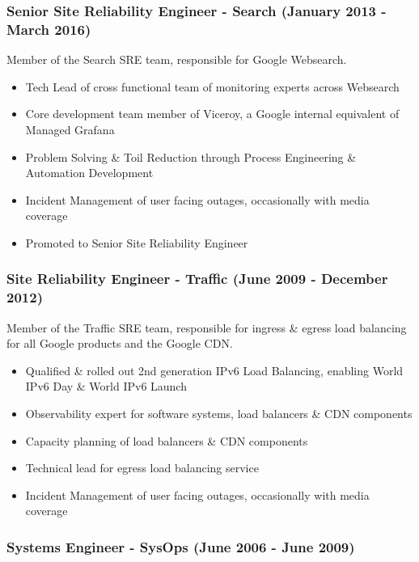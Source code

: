 \documentclass[a4paper, 10pt] {article}
\begin{document}
\subsubsection*{Senior Site Reliability Engineer - Search (January 2013 - March 2016)}

Member of the Search SRE team, responsible for Google Websearch.

\begin{itemize}
  \item Tech Lead of cross functional team of monitoring experts across Websearch
  \item Core development team member of Viceroy, a Google internal equivalent of Managed Grafana
  \item Problem Solving \& Toil Reduction through Process Engineering \& Automation Development
  \item Incident Management of user facing outages, occasionally with media coverage
  \item Promoted to Senior Site Reliability Engineer
\end{itemize}

\subsubsection*{Site Reliability Engineer - Traffic (June 2009 - December 2012)}

Member of the Traffic SRE team, responsible for ingress \& egress load balancing for all Google products and the Google CDN. 

\begin{itemize}
  \item Qualified \& rolled out 2nd generation IPv6 Load Balancing, enabling World IPv6 Day \& World IPv6 Launch
  \item Observability expert for software systems, load balancers \& CDN components
  \item Capacity planning of load balancers \& CDN components
  \item Technical lead for egress load balancing service
  \item Incident Management of user facing outages, occasionally with media coverage
\end{itemize}

\subsubsection*{Systems Engineer - SysOps (June 2006 - June 2009)}
\end{document}
